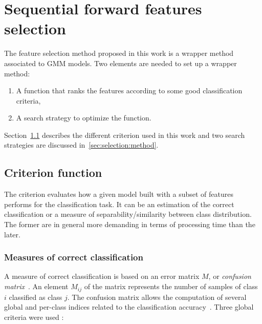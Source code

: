 \documentclass[journal]{IEEEtran}
\begin{document}
\section{Sequential forward features selection}
\label{sec:selection}

The feature selection method proposed in this work is a wrapper method associated to GMM models. Two elements are needed to set up a wrapper method:
\begin{enumerate}
\item A function that  ranks the features according to some good classification criteria,
\item A search strategy to optimize the function.
\end{enumerate}

Section~\ref{sec:criterion} describes the different criterion used in this work and two search strategies are discussed in~\ref{sec:selection:method}.


    \subsection{Criterion function}
    \label{sec:criterion}
    The criterion evaluates how a given model built with a subset of features performs for the classification task. It can be an estimation of the correct classification or a measure of separability/similarity between class distribution. The former are in general more demanding in terms of processing time than the later.


        \subsubsection{Measures of correct classification}
        \label{sec:criterion-rate}

        A measure of correct classification is based on an error matrix $M$, or \emph{confusion matrix}~\cite[Chapter 4]{congalton2008assessing}. An element $M_{ij}$ of the matrix represents the number of samples of class $i$ classified as class $j$. The confusion matrix allows the computation of several global and per-class indices related to the classification accuracy~\cite{congalton2008assessing}. Three global criteria were used :
\end{document}

